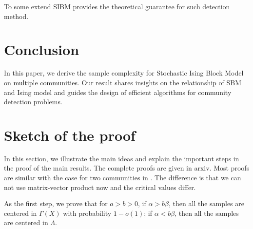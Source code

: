 \label{key}\documentclass[conference]{IEEEtran}
\begin{document}
To some extend
SIBM provides the theoretical guarantee for such detection method.

\section{Conclusion}\label{s:conclusion}
In this paper, we derive the sample complexity for Stochastic Ising Block Model on multiple communities.
Our result shares insights on the relationship of SBM and Ising model and guides the design of efficient algorithms
for community detection problems.
\appendix
\section{Sketch of the proof}
\label{sect:sketch}

In this section, we illustrate the main ideas and explain the important steps in the proof of the main results.
The complete proofs are given in arxiv. Most proofs are similar with the case for two communities in \cite{ye2020exact}. The difference
is that we can not use matrix-vector product now and the critical values differ.

As the first step, we prove that for $a>b>0$, if $\alpha>b\beta$, then all the samples are centered in $\Gamma(X)$ with probability $1-o(1)$;
if $\alpha<b\beta$, then all the samples are centered in $\Lambda$.
\end{document}
